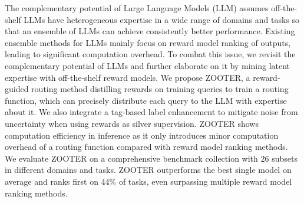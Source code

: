 The complementary potential of Large Language Models (LLM) assumes off-the-shelf LLMs have heterogeneous expertise in a wide range of domains and tasks so that an ensemble of LLMs can achieve consistently better performance. Existing ensemble methods for LLMs mainly focus on reward model ranking of outputs, leading to significant computation overhead. To combat this issue, we revisit the complementary potential of LLMs and further elaborate on it by mining latent expertise with off-the-shelf reward models. We propose ZOOTER, a reward-guided routing method distilling rewards on training queries to train a routing function, which can precisely distribute each query to the LLM with expertise about it. We also integrate a tag-based label enhancement to mitigate noise from uncertainty when using rewards as silver supervision. ZOOTER shows computation efficiency in inference as it only introduces minor computation overhead of a routing function compared with reward model ranking methods. We evaluate ZOOTER on a comprehensive benchmark collection with 26 subsets in different domains and tasks. ZOOTER outperforms the best single model on average and ranks first on 44\% of tasks, even surpassing multiple reward model ranking methods.
